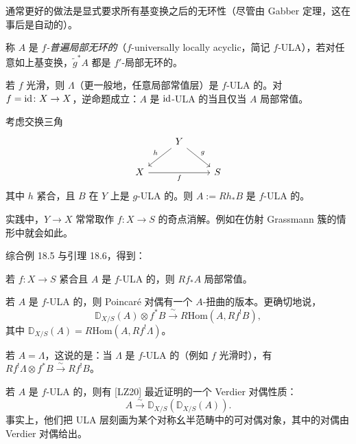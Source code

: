 通常更好的做法是显式要求所有基变换之后的无环性（尽管由 Gabber 定理，这在事后是自动的）。

\begin{definition}
称 $A$ 是 \emph{$f$-普遍局部无环的}（$f$-universally locally acyclic，简记 $f$-ULA），若对任意如上基变换，$\tilde g^*A$ 都是 $f'$-局部无环的。
\end{definition}

\begin{example}
若 $f$ 光滑，则 $\Lambda$（更一般地，任意局部常值层）是 $f$-ULA 的。对 $f=\operatorname{id}\colon X\to X$，逆命题成立：$A$ 是 $\operatorname{id}$-ULA 的当且仅当 $A$ 局部常值。
\end{example}

\begin{lemma}
考虑交换三角
\[
\begin{tikzcd}
& Y \arrow[dl, "h"'] \arrow[dr, "g"] & \\
X \arrow[rr, "f"'] & & S
\end{tikzcd}
\]
其中 $h$ 紧合，且 $B$ 在 $Y$ 上是 $g$-ULA 的。则 $A:=Rh_*B$ 是 $f$-ULA 的。
\end{lemma}

\begin{example}
实践中，$Y\to X$ 常常取作 $f\colon X\to S$ 的奇点消解。例如在仿射 Grassmann 簇的情形中就会如此。
\end{example}

综合例 18.5 与引理 18.6，得到：

\begin{corollary}
若 $f\colon X\to S$ 紧合且 $A$ 是 $f$-ULA 的，则 $Rf_*A$ 局部常值。
\end{corollary}


\begin{remark}[扭曲 Verdier 对偶]
若 $A$ 是 $f$-ULA 的，则 Poincaré 对偶有一个 $A$-扭曲的版本。更确切地说，
\[
\mathbb{D}_{X/S}(A)\otimes f^*B\xrightarrow{\ \sim\ }R\mathrm{Hom}(A,Rf^!B),
\]
其中 $\mathbb{D}_{X/S}(A)=R\mathrm{Hom}(A,Rf^!\Lambda)$。
\end{remark}

若 $A=\Lambda$，这说的是：当 $\Lambda$ 是 $f$-ULA 的（例如 $f$ 光滑时），有 $Rf^!\Lambda\otimes f^*B\xrightarrow{\ \sim\ }Rf^!B$。

\begin{example}
若 $A$ 是 $f$-ULA 的，则有 [LZ20] 最近证明的一个 Verdier 对偶性质：
\[
A\xrightarrow{\ \sim\ }\mathbb{D}_{X/S}(\mathbb{D}_{X/S}(A)).
\]
事实上，他们把 ULA 层刻画为某个对称幺半范畴中的可对偶对象，其中的对偶由 Verdier 对偶给出。
\end{example}

